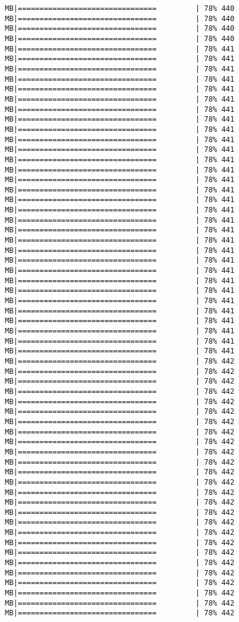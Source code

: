 \documentclass[
]{article}
\begin{document}
\begin{verbatim}
MB|================================         | 78% 440 MB|================================         | 78% 440 MB|================================         | 78% 440 MB|================================         | 78% 440 MB|================================         | 78% 441 MB|================================         | 78% 441 MB|================================         | 78% 441 MB|================================         | 78% 441 MB|================================         | 78% 441 MB|================================         | 78% 441 MB|================================         | 78% 441 MB|================================         | 78% 441 MB|================================         | 78% 441 MB|================================         | 78% 441 MB|================================         | 78% 441 MB|================================         | 78% 441 MB|================================         | 78% 441 MB|================================         | 78% 441 MB|================================         | 78% 441 MB|================================         | 78% 441 MB|================================         | 78% 441 MB|================================         | 78% 441 MB|================================         | 78% 441 MB|================================         | 78% 441 MB|================================         | 78% 441 MB|================================         | 78% 441 MB|================================         | 78% 441 MB|================================         | 78% 441 MB|================================         | 78% 441 MB|================================         | 78% 441 MB|================================         | 78% 441 MB|================================         | 78% 441 MB|================================         | 78% 441 MB|================================         | 78% 441 MB|================================         | 78% 441 MB|================================         | 78% 442 MB|================================         | 78% 442 MB|================================         | 78% 442 MB|================================         | 78% 442 MB|================================         | 78% 442 MB|================================         | 78% 442 MB|================================         | 78% 442 MB|================================         | 78% 442 MB|================================         | 78% 442 MB|================================         | 78% 442 MB|================================         | 78% 442 MB|================================         | 78% 442 MB|================================         | 78% 442 MB|================================         | 78% 442 MB|================================         | 78% 442 MB|================================         | 78% 442 MB|================================         | 78% 442 MB|================================         | 78% 442 MB|================================         | 78% 442 MB|================================         | 78% 442 MB|================================         | 78% 442 MB|================================         | 78% 442 MB|================================         | 78% 442 MB|================================         | 78% 442 MB|================================         | 78% 442 MB|================================         | 78% 442 
\end{verbatim}
\end{document}

